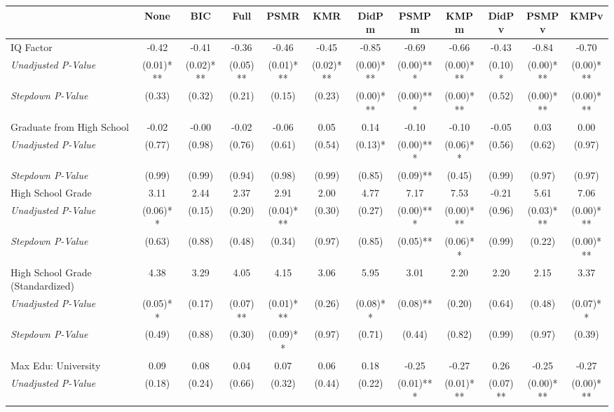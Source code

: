 \begin{tabular}{l c c c c c c c c c c c}
\toprule
 & None & BIC & Full & PSMR & KMR & DidPm & PSMPm & KMPm & DidPv & PSMPv & KMPv \\
\midrule
IQ Factor & -0.42 & -0.41 & -0.36 & -0.46 & -0.45 & -0.85 & -0.69 & -0.66 & -0.43 & -0.84 & -0.70 \\
\quad \textit{Unadjusted P-Value} & (0.01)*** & (0.02)*** & (0.05)** & (0.01)*** & (0.02)*** & (0.00)*** & (0.00)*** & (0.00)*** & (0.10)* & (0.00)*** & (0.00)*** \\
\quad \textit{Stepdown P-Value} & (0.33) & (0.32) & (0.21) & (0.15) & (0.23) & (0.00)*** & (0.00)*** & (0.00)*** & (0.52) & (0.00)*** & (0.00)*** \\
Graduate from High School & -0.02 & -0.00 & -0.02 & -0.06 & 0.05 & 0.14 & -0.10 & -0.10 & -0.05 & 0.03 & 0.00 \\
\quad \textit{Unadjusted P-Value} & (0.77) & (0.98) & (0.76) & (0.61) & (0.54) & (0.13)* & (0.00)*** & (0.06)** & (0.56) & (0.62) & (0.97) \\
\quad \textit{Stepdown P-Value} & (0.99) & (0.99) & (0.94) & (0.98) & (0.99) & (0.85) & (0.09)** & (0.45) & (0.99) & (0.97) & (0.97) \\
High School Grade & 3.11 & 2.44 & 2.37 & 2.91 & 2.00 & 4.77 & 7.17 & 7.53 & -0.21 & 5.61 & 7.06 \\
\quad \textit{Unadjusted P-Value} & (0.06)** & (0.15) & (0.20) & (0.04)*** & (0.30) & (0.27) & (0.00)*** & (0.00)*** & (0.96) & (0.03)*** & (0.00)*** \\
\quad \textit{Stepdown P-Value} & (0.63) & (0.88) & (0.48) & (0.34) & (0.97) & (0.85) & (0.05)** & (0.06)** & (0.99) & (0.22) & (0.00)*** \\
High School Grade (Standardized) & 4.38 & 3.29 & 4.05 & 4.15 & 3.06 & 5.95 & 3.01 & 2.20 & 2.20 & 2.15 & 3.37 \\
\quad \textit{Unadjusted P-Value} & (0.05)** & (0.17) & (0.07)** & (0.01)*** & (0.26) & (0.08)** & (0.08)** & (0.20) & (0.64) & (0.48) & (0.07)** \\
\quad \textit{Stepdown P-Value} & (0.49) & (0.88) & (0.30) & (0.09)** & (0.97) & (0.71) & (0.44) & (0.82) & (0.99) & (0.97) & (0.39) \\
Max Edu: University & 0.09 & 0.08 & 0.04 & 0.07 & 0.06 & 0.18 & -0.25 & -0.27 & 0.26 & -0.25 & -0.27 \\
\quad \textit{Unadjusted P-Value} & (0.18) & (0.24) & (0.66) & (0.32) & (0.44) & (0.22) & (0.01)*** & (0.01)*** & (0.07)** & (0.00)*** & (0.00)*** \\

\end{tabular}
